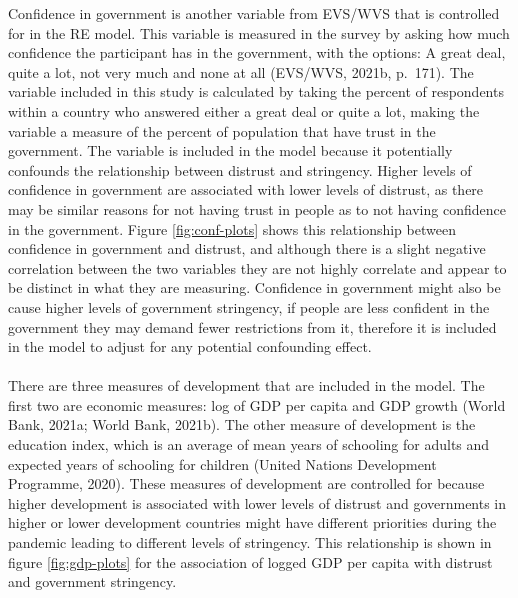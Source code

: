 \documentclass[
  11pt,
]{article}
\begin{document}
Confidence in government is another variable from EVS/WVS that is controlled for in the RE model. This variable is measured in the survey by asking how much confidence the participant has in the government, with the options: A great deal, quite a lot, not very much and none at all (EVS/WVS, 2021b, p.~171). The variable included in this study is calculated by taking the percent of respondents within a country who answered either a great deal or quite a lot, making the variable a measure of the percent of population that have trust in the government. The variable is included in the model because it potentially confounds the relationship between distrust and stringency. Higher levels of confidence in government are associated with lower levels of distrust, as there may be similar reasons for not having trust in people as to not having confidence in the government. Figure \ref{fig:conf-plots} shows this relationship between confidence in government and distrust, and although there is a slight negative correlation between the two variables they are not highly correlate and appear to be distinct in what they are measuring. Confidence in government might also be cause higher levels of government stringency, if people are less confident in the government they may demand fewer restrictions from it, therefore it is included in the model to adjust for any potential confounding effect.\\
~\\
There are three measures of development that are included in the model. The first two are economic measures: log of GDP per capita and GDP growth (World Bank, 2021a; World Bank, 2021b). The other measure of development is the education index, which is an average of mean years of schooling for adults and expected years of schooling for children (United Nations Development Programme, 2020). These measures of development are controlled for because higher development is associated with lower levels of distrust and governments in higher or lower development countries might have different priorities during the pandemic leading to different levels of stringency. This relationship is shown in figure \ref{fig:gdp-plots} for the association of logged GDP per capita with distrust and government stringency.\\
~\\
\end{document}
